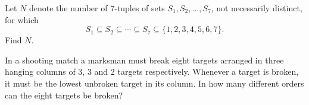 \documentclass[11 pt]{scrartcl}
\newif\ifproblemsol
\begin{document}
\begin{exercise}
    Let $N$ denote the number of $7$-tuples of sets $S_1, S_2, \dots,S_7$, not necessarily distinct, for which 
    \[ S_1 \subseteq S_2 \subseteq \cdots \subseteq S_7 \subseteq \{1,2,3,4,5,6,7\}.\] 
    Find $N$. 
\end{exercise}
\ifproblemsol
\begin{proof}[Solution]
    For each number, if it appears in a set $S_i$, then it appears in all sets $S_j$ where $j \geq i$. So for each number, we have 7 ways to pick the first set it starts appearing in, or none at all, for a total of 8 choices. Thus $N = 8^7$. 
\end{proof}
\fi

\begin{exercise}
    In a shooting match a marksman must break eight targets arranged in three hanging columns of 3, 3 and 2 targets respectively. Whenever a target is broken, it must be the lowest unbroken target in its column. In how many different orders can the eight targets be broken? 
\end{exercise}
\ifproblemsol
\begin{proof}[Solution]
    Consider a string such as $AAABBBCC$ as a set of instructions, where the appearance of an $A$ means shoot at the lowest hanging target in the first column, $B$ means shoot in the second column, and $C$ means shoot in the third column. Then every permutation of this string gives a new way to break the eight targets, for a total of $\frac{8!}{3!3!2!}$. 
\end{proof}
\fi
\end{document}
